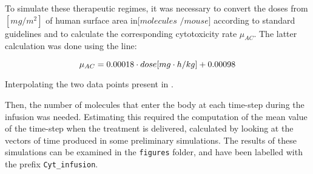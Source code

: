 To simulate these therapeutic regimes, it was necessary to convert the doses from $[mg / m^2]$ of human surface area in$[molecules$ $/mouse]$ according to standard guidelines \cite{dose-conversion} and to calculate the corresponding cytotoxicity rate $\mu_{AC}$. The latter calculation was done using the line: 

$$ \mu_{AC} = 0.00018 \cdot \small{dose} [mg \cdot h/kg]+ 0.00098 $$

Interpolating the two data points present in \cite{main-paper}. 

Then, the number of molecules that enter the body at each time-step during the infusion was needed. Estimating this required the computation of the mean value of the time-step when the treatment is delivered, calculated by looking at the vectors of time produced in some preliminary simulations. The results of these simulations can be examined in the \texttt{figures} folder, and have been labelled with the prefix \texttt{Cyt\_infusion}. 
